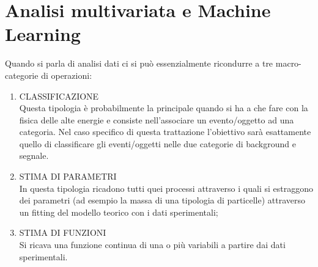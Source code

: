 \section{Analisi multivariata e Machine Learning}
\label{analisi multivariata e ML}

	Quando si parla di analisi dati ci si può essenzialmente ricondurre a tre macro-categorie di operazioni:

\begin{enumerate}
	\item CLASSIFICAZIONE \\
	Questa tipologia è probabilmente la principale quando si ha a che fare con la fisica delle alte energie e consiste nell'associare un evento/oggetto  ad una categoria. Nel caso specifico di questa trattazione l'obiettivo sarà esattamente quello di classificare gli eventi/oggetti nelle due categorie di background e segnale.

	\item STIMA DI PARAMETRI \\
	In questa tipologia ricadono tutti quei processi attraverso i quali si estraggono dei parametri (ad esempio la massa di una tipologia di particelle) attraverso un fitting del modello teorico con i dati sperimentali;
	
	\item STIMA DI FUNZIONI \\
	Si ricava una funzione continua di una o più variabili a partire dai dati sperimentali.
\end{enumerate}

